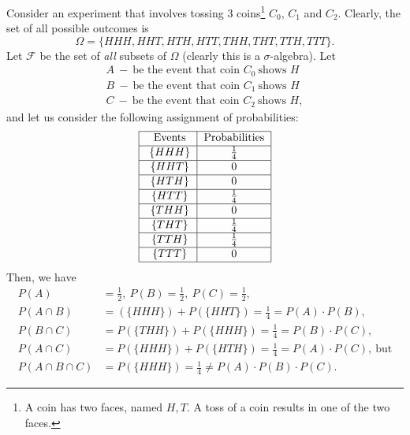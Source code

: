 \documentclass[12pt]{article}
\begin{document}
\begin{enumerate}
Consider an experiment that involves tossing $3$ coins\footnote{A coin has two faces, named $H,T$. A toss of a coin results in one of the two faces.} $C_{0}$, $C_{1}$ and $C_{2}$. Clearly, the set of all possible outcomes is 
\begin{equation}
\Omega = \{HHH,HHT,HTH,HTT,THH,THT,TTH,TTT\}\nonumber.
\end{equation}
Let $\mathcal{F}$ be the set of \emph{all} subsets of $\Omega$ (clearly this is a $\sigma$-algebra). Let
\begin{align}
A~-~\text{be the event that coin }C_{0}~\text{shows }H\nonumber\\
B~-~\text{be the event that coin }C_{1}~\text{shows }H\nonumber\\
C~-~\text{be the event that coin }C_{2}~\text{shows }H\nonumber,
\end{align}
and let us consider the following assignment of probabilities:\\
\[\centering
\begin{tabular}{|c|c|}
	\hline 
	\rule[-1ex]{0pt}{2.5ex} Events & Probabilities \\ 
	\hline 
	\rule[-1ex]{0pt}{2.5ex} $ \{HHH\} $ & $ \frac{1}{4} $ \\ 
	\hline 
	\rule[-1ex]{0pt}{2.5ex}  $ \{HHT\} $ & $0 $  \\ 
	\hline 
	\rule[-1ex]{0pt}{2.5ex}  $ \{HTH\} $ & $ 0 $  \\ 
	\hline 
	\rule[-1ex]{0pt}{2.5ex}  $ \{HTT\} $ & $ \frac{1}{4} $  \\ 
	\hline 
	\rule[-1ex]{0pt}{2.5ex}  $ \{THH\} $ & $ 0 $  \\ 
	\hline 
	\rule[-1ex]{0pt}{2.5ex}  $ \{THT\} $ & $ \frac{1}{4} $  \\ 
	\hline 
	\rule[-1ex]{0pt}{2.5ex}  $ \{TTH\} $ & $ \frac{1}{4} $  \\ 
	\hline 
	\rule[-1ex]{0pt}{2.5ex}  $ \{TTT\} $ & $ 0 $  \\ 
	\hline 
\end{tabular} 
\]
Then, we have
\begin{align}
P(A)&=\frac{1}{2},~P(B)=\frac{1}{2},~P(C)=\frac{1}{2},\nonumber\\
P(A\cap B)&=(\{HHH\})+P(\{HHT\})=\frac{1}{4}=P(A)\cdot P(B),\nonumber\\
P(B\cap C)&=P(\{THH\})+P(\{HHH\})=\frac{1}{4}=P(B)\cdot P(C),\nonumber\\
P(A\cap C)&=P(\{HHH\})+P(\{HTH\})=\frac{1}{4}=P(A)\cdot P(C),~\text{but}\nonumber\\
P(A\cap B\cap C)&=P(\{HHH\})=\frac{1}{4}\neq P(A)\cdot P(B)\cdot P(C).\nonumber
\end{align}


\end{enumerate}
\end{document}
